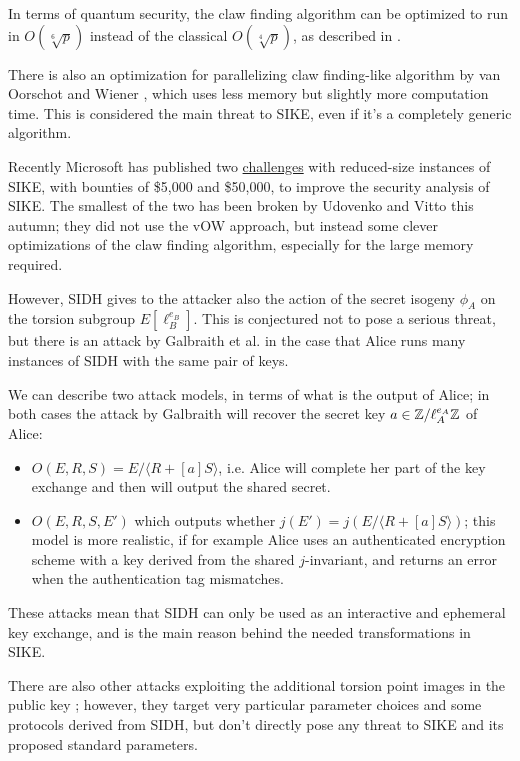 In terms of quantum security, the claw finding algorithm can be optimized to run in $O(\sqrt[6]{p})$ instead of the classical $O(\sqrt[4]{p})$, as described in \cite{Tani_claw}.

There is also an optimization for parallelizing claw finding-like algorithm by van Oorschot and Wiener \cite{vOW}, which uses less memory but slightly more computation time. This is considered the main threat to SIKE, even if it's a completely generic algorithm.

Recently Microsoft has published two \href{https://www.microsoft.com/en-us/msrc/sike-cryptographic-challenge}{challenges} with reduced-size instances of SIKE, with bounties of \$5,000 and \$50,000, to improve the security analysis of SIKE. The smallest of the two has been broken by Udovenko and Vitto \cite{SIKE_challenge} this autumn; they did not use the vOW approach, but instead some clever optimizations of the claw finding algorithm, especially for the large memory required.


However, SIDH gives to the attacker also the action of the secret isogeny $\phi_A$ on the torsion subgroup $E[\ell_B^{e_B}]$. This is conjectured not to pose a serious threat, but there is an attack by Galbraith et al. \cite{Galbraith_SIKE} in the case that Alice runs many instances of SIDH with the same pair of keys.

We can describe two attack models, in terms of what is the output of Alice; in both cases the attack by Galbraith will recover the secret key $a\in\mathbb{Z}/\ell_A^{e_A}\mathbb{Z}$ of Alice:
\begin{itemize}
    \item $O(E,R,S)=E/\langle R+[a]S\rangle$, i.e. Alice will complete her part of the key exchange and then will output the shared secret.
    \item $O(E,R,S,E')$ which outputs whether $j(E')=j(E/\langle R+[a]S\rangle)$; this model is more realistic, if for example Alice uses an authenticated encryption scheme with a key derived from the shared $j$-invariant, and returns an error when the authentication tag mismatches.
\end{itemize}

These attacks mean that SIDH can only be used as an interactive and ephemeral key exchange, and is the main reason behind the needed transformations in SIKE.

There are also other attacks exploiting the additional torsion point images in the public key \cite{SIDH_tp1, SIDH_tp2}; however, they target very particular parameter choices and some protocols derived from SIDH, but don't directly pose any threat to SIKE and its proposed standard parameters.

